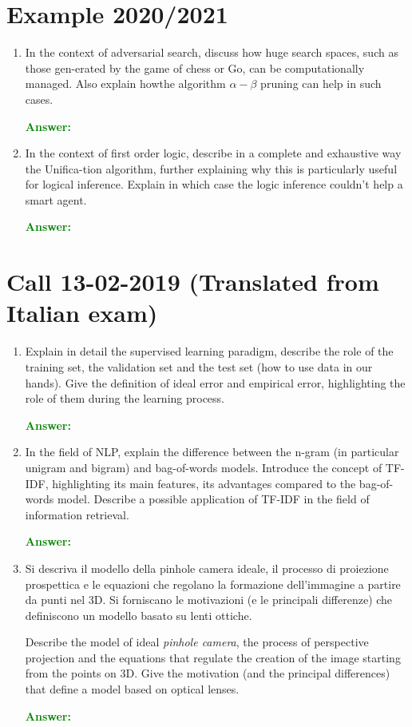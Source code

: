\documentclass[12pt]{article}
\begin{document}
\section{Example 2020/2021}
\begin{enumerate}[label=\textbf{C.\arabic*}]
    \item In the context of adversarial search, discuss how huge search spaces, such as those gen-erated by the game of chess or Go, can be computationally managed.
    Also explain howthe algorithm $\alpha - \beta$ pruning can help in such cases.

    \textcolor{green}{\textbf{Answer:}}

    \item In the context of first order logic, describe in a complete and exhaustive way the Unifica-tion algorithm, further explaining why this is particularly useful for logical inference.
    Explain in which case the logic inference couldn't help a smart agent.
    
    \textcolor{green}{\textbf{Answer:}}

\end{enumerate}

\section{Call 13-02-2019 (Translated from Italian exam)}
\begin{enumerate}[label=\textbf{D.\arabic*}]
    \item Explain in detail the supervised learning paradigm, describe the role of the training set, the validation set and the test set (how to use data in our hands).
    Give the definition of ideal error and empirical error, highlighting the role of them during the learning process.

    \textcolor{green}{\textbf{Answer:}}

    \item In the field of NLP, explain the difference between the n-gram (in particular unigram and bigram) and bag-of-words models.
    Introduce the concept of TF-IDF, highlighting its main features, its advantages compared to the bag-of-words model.
    Describe a possible application of TF-IDF in the field of information retrieval.

    \textcolor{green}{\textbf{Answer:}}

    \item Si descriva il modello della pinhole camera ideale, il processo di proiezione prospettica e le equazioni che regolano la formazione dell'immagine a partire da punti nel 3D.
    Si forniscano le motivazioni (e le principali differenze) che definiscono un modello basato su lenti ottiche.

    Describe the model of ideal \textit{pinhole camera}, the process of perspective projection and the equations that regulate the creation of the image starting from the points on 3D.
    Give the motivation (and the principal differences) that define a model based on optical lenses.

    \textcolor{green}{\textbf{Answer:}}



\end{enumerate}
\end{document}

